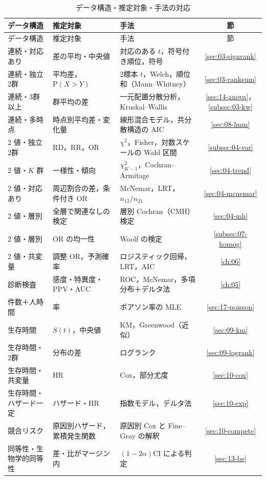 \documentclass[a4paper,11pt,openany]{ltjsbook}
\newcommand{\Prob}{\mathrm{P}}
\begin{document}
\begin{center}\small
\begin{longtable}{@{}L{36mm}L{30mm}L{52mm}c@{}}
\caption{データ構造・推定対象・手法の対応}\label{tab:A-select}\\
\toprule
データ構造 & 推定対象 & 手法 & 節\\
\midrule
\endfirsthead
\toprule
データ構造 & 推定対象 & 手法 & 節\\
\midrule
\endhead
\bottomrule
\endfoot
連続・対応あり & 差の平均・中央値 & 対応のある $t$，符号付き順位，符号 & \ref{sec:03-signrank}\\
連続・独立2群 & 平均差，$\Prob(X>Y)$ & 2標本 $t$，Welch，順位和（Mann--Whitney） & \ref{sec:03-ranksum}\\
連続・3群以上 & 群平均の差 & 一元配置分散分析，Kruskal--Wallis & \ref{sec:14-anova}，\ref{subsec:03-kw}\\
連続・多時点 & 時点別平均差・変化量 & 線形混合モデル，共分散構造の AIC & \ref{sec:08-lmm}\\
2 値・独立2群 & RD，RR，OR & $\chi^2$，Fisher，対数スケールの Wald 区間 & \ref{subsec:04-var}\\
2 値・$K$ 群 & 一様性・傾向 & $\chi^2_{K-1}$，Cochran--Armitage & \ref{sec:04-trend}\\
2 値・対応あり & 周辺割合の差，条件付き OR & McNemar，LRT，$n_{12}/n_{21}$ & \ref{sec:04-mcnemar}\\
2 値・層別 & 全層で関連なしの検定 & 層別 Cochran（CMH）検定 & \ref{sec:04-mh}\\
2 値・層別 & OR の均一性 & Woolf の検定 & \ref{subsec:07-homog}\\
2 値・共変量 & 調整 OR，予測確率 & ロジスティック回帰，LRT，AIC & \ref{ch:06}\\
診断検査 & 感度・特異度・PPV・AUC & ROC，McNemar，多項分布＋デルタ法 & \ref{ch:05}\\
件数＋人時間 & 率 & ポアソン率の MLE & \ref{sec:17-poisson}\\
生存時間 & $S(t)$，中央値 & KM，Greenwood（近似） & \ref{sec:09-km}\\
生存時間・2群 & 分布の差 & ログランク & \ref{sec:09-logrank}\\
生存時間・共変量 & HR & Cox，部分尤度 & \ref{sec:10-cox}\\
生存時間・ハザード一定 & ハザード・HR & 指数モデル，デルタ法 & \ref{sec:10-exp}\\
競合リスク & 原因別ハザード，累積発生関数 & 原因別 Cox と Fine--Gray の解釈 & \ref{sec:10-compete}\\
同等性・生物学的同等性 & 差・比がマージン内 & $(1-2\alpha)$CI による判定 & \ref{sec:13-be}\\

\end{longtable}
\end{center}
\end{document}
